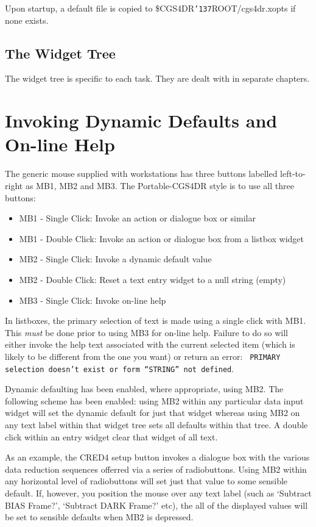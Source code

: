 \documentclass[a4paper]{book}
\renewcommand{\_}{{\tt\char'137}}
\begin{document}
Upon startup, a default file is copied to \$CGS4DR\_ROOT/cgs4dr.xopts if none exists.

\subsection{The Widget Tree}
The widget tree is specific to each task. They are dealt with in separate chapters.

\section{Invoking Dynamic Defaults and On-line Help}
The generic mouse supplied with workstations has three buttons labelled
left-to-right as MB1, MB2 and MB3. The Portable-CGS4DR style is to use
all three buttons:

\begin{itemize}
\item MB1 - Single Click: Invoke an action or dialogue box or similar 
\item MB1 - Double Click: Invoke an action or dialogue box from a listbox widget
\item MB2 - Single Click: Invoke a dynamic default value 
\item MB2 - Double Click: Reset a text entry widget to a null string (empty) 
\item MB3 - Single Click: Invoke on-line help 
\end{itemize}

In listboxes, the primary selection of text is made using a single click with MB1.
This {\em must} be done prior to using MB3 for on-line help. Failure to do so will 
either invoke the help text associated with the current selected item (which is 
likely to be different from the one you want) or return an error: {\tt
PRIMARY selection doesn't exist or form ``STRING'' not defined}.

Dynamic defaulting has been enabled, where appropriate, using MB2. The following
scheme has been enabled: using MB2 within any particular data input widget will set the
dynamic default for just that widget whereas using MB2 on any text label within
that widget tree sets all defaults within that tree. A double click within an entry
widget clear that widget of all text.

As an example, the CRED4 setup button invokes a dialogue box with the various
data reduction sequences offerred via a series of radiobuttons. Using MB2
within any horizontal level of radiobuttons will set just that value to some
sensible default. If, however, you position the mouse over any text label
(such as `Subtract BIAS Frame?', `Subtract DARK Frame?' etc), the all of the
displayed values will be set to sensible defaults when MB2 is depressed.
\end{document}

